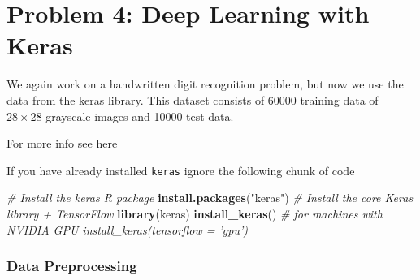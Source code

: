 \documentclass[]{article}
\newenvironment{Shaded}{\begin{snugshade}}{\end{snugshade}}
\newcommand{\CommentTok}[1]{\textcolor[rgb]{0.56,0.35,0.01}{\textit{#1}}}
\newcommand{\KeywordTok}[1]{\textcolor[rgb]{0.13,0.29,0.53}{\textbf{#1}}}
\newcommand{\NormalTok}[1]{#1}
\newcommand{\StringTok}[1]{\textcolor[rgb]{0.31,0.60,0.02}{#1}}
\begin{document}
\hypertarget{problem-4-deep-learning-with-keras}{%
\section{Problem 4: Deep Learning with
Keras}\label{problem-4-deep-learning-with-keras}}

We again work on a handwritten digit recognition problem, but now we use
the data from the keras library. This dataset consists of 60000 training
data of \(28\times28\) grayscale images and 10000 test data.

For more info see \href{https://keras.rstudio.com/}{here}

If you have already installed \texttt{keras} ignore the following chunk
of code

\begin{Shaded}
\begin{Highlighting}[]
\CommentTok{# Install the keras R package}
\KeywordTok{install.packages}\NormalTok{(}\StringTok{"keras"}\NormalTok{)}
\CommentTok{# Install the core Keras library + TensorFlow}
\KeywordTok{library}\NormalTok{(keras)}
\KeywordTok{install_keras}\NormalTok{()}
\CommentTok{# for machines with NVIDIA GPU install_keras(tensorflow = 'gpu')}
\end{Highlighting}
\end{Shaded}

\hypertarget{data-preprocessing}{%
\subsubsection{Data Preprocessing}\label{data-preprocessing}}
\end{document}
